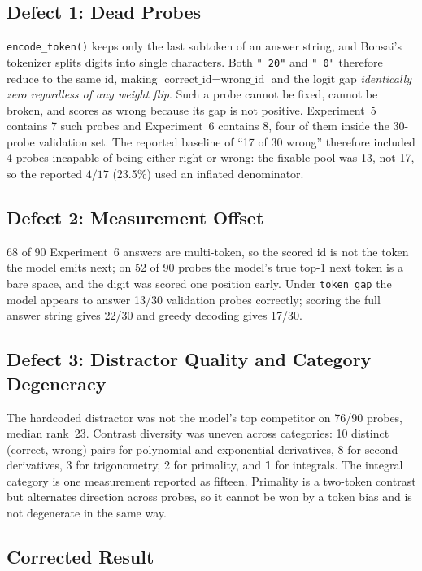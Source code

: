 \documentclass[11pt,a4paper]{article}
\begin{document}
\subsection{Defect 1: Dead Probes}

\texttt{encode\_token()} keeps only the last subtoken of an answer string, and
Bonsai's tokenizer splits digits into single characters. Both \texttt{" 20"} and
\texttt{" 0"} therefore reduce to the same id, making
$\text{correct\_id} = \text{wrong\_id}$ and the logit gap \emph{identically zero
regardless of any weight flip}. Such a probe cannot be fixed, cannot be broken,
and scores as wrong because its gap is not positive. Experiment~5 contains 7 such
probes and Experiment~6 contains 8, four of them inside the 30-probe validation
set. The reported baseline of ``17 of 30 wrong'' therefore included 4 probes
incapable of being either right or wrong: the fixable pool was 13, not 17, so the
reported $4/17$ (23.5\%) used an inflated denominator.

\subsection{Defect 2: Measurement Offset}

68 of 90 Experiment~6 answers are multi-token, so the scored id is not the token
the model emits next; on 52 of 90 probes the model's true top-1 next token is a
bare space, and the digit was scored one position early. Under \texttt{token\_gap}
the model appears to answer 13/30 validation probes correctly; scoring the full
answer string gives 22/30 and greedy decoding gives 17/30.

\subsection{Defect 3: Distractor Quality and Category Degeneracy}

The hardcoded distractor was not the model's top competitor on 76/90 probes,
median rank~23. Contrast diversity was uneven across categories: 10 distinct
(correct, wrong) pairs for polynomial and exponential derivatives, 8 for second
derivatives, 3 for trigonometry, 2 for primality, and \textbf{1} for integrals.
The integral category is one measurement reported as fifteen. Primality is a
two-token contrast but alternates direction across probes, so it cannot be won by
a token bias and is not degenerate in the same way.

\subsection{Corrected Result}
\end{document}
